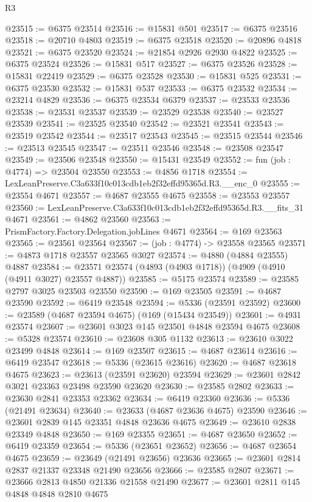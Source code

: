 \begin{lexlean}{R3}
\begin{coremodule}
@23515 := @6375 @23514
@23516 := @15831 @501
@23517 := @6375 @23516
@23518 := @20710 @4803
@23519 := @6375 @23518
@23520 := @20896 @4818
@23521 := @6375 @23520
@23524 := @21854 @2926 @2930 @4822
@23525 := @6375 @23524
@23526 := @15831 @517
@23527 := @6375 @23526
@23528 := @15831 @22419
@23529 := @6375 @23528
@23530 := @15831 @525
@23531 := @6375 @23530
@23532 := @15831 @537
@23533 := @6375 @23532
@23534 := @23214 @4829
@23536 := @6375 @23534 @6379
@23537 := @23533 @23536
@23538 := @23531 @23537
@23539 := @23529 @23538
@23540 := @23527 @23539
@23541 := @23525 @23540
@23542 := @23521 @23541
@23543 := @23519 @23542
@23544 := @23517 @23543
@23545 := @23515 @23544
@23546 := @23513 @23545
@23547 := @23511 @23546
@23548 := @23508 @23547
@23549 := @23506 @23548
@23550 := @15431 @23549
@23552 := fun (job : @4774) => @23504 @23550
@23553 := @4856 @1718
@23554 := LexLeanPreserve.C3a633f10c013cdb1eb2f32effd95365d.R3.__enc_0
@23555 := @23554 @4671
@23557 := @4687 @23555 @4675
@23558 := @23553 @23557
@23560 := LexLeanPreserve.C3a633f10c013cdb1eb2f32effd95365d.R3.__fits_31 @4671
@23561 := @4862 @23560
@23563 := PrismFactory.Factory.Delegation.jobLines @4671
@23564 := @169 @23563
@23565 := @23561 @23564
@23567 := (job : @4774) -> @23558 @23565
@23571 := @4873 @1718 @23557 @23565 @3027
@23574 := @4880 (@4884 @23555) @4887
@23584 := @23571 @23574 (@4893 (@4903 @1718)) (@4909 (@4910 (@4911 @3027) @23557 @4887))
@23585 := @5175 @23574
@23589 := @23585 @2797 @3025 @23503 @23550
@23590 := @169 @23505
@23591 := @4687 @23590
@23592 := @6419 @23548
@23594 := @5336 (@23591 @23592)
@23600 := @23589 (@4687 @23594 @4675) (@169 (@15434 @23549))
@23601 := @4931 @23574
@23607 := @23601 @3023 @145 @23501 @4848 @23594 @4675
@23608 := @5328 @23574
@23610 := @23608 @305 @1132
@23613 := @23610 @3022 @23499 @4848
@23614 := @169 @23507
@23615 := @4687 @23614
@23616 := @6419 @23547
@23618 := @5336 (@23615 @23616)
@23620 := @4687 @23618 @4675
@23623 := @23613 (@23591 @23620) @23594
@23629 := @23601 @2842 @3021 @23363 @23498 @23590 @23620
@23630 := @23585 @2802
@23633 := @23630 @2841 @23353 @23362
@23634 := @6419 @23360
@23636 := @5336 (@21491 @23634)
@23640 := @23633 (@4687 @23636 @4675) @23590
@23646 := @23601 @2839 @145 @23351 @4848 @23636 @4675
@23649 := @23610 @2838 @23349 @4848
@23650 := @169 @23355
@23651 := @4687 @23650
@23652 := @6419 @23359
@23654 := @5336 (@23651 @23652)
@23656 := @4687 @23654 @4675
@23659 := @23649 (@21491 @23656) @23636
@23665 := @23601 @2814 @2837 @21337 @23348 @21490 @23656
@23666 := @23585 @2807
@23671 := @23666 @2813 @4850 @21336 @21558 @21490
@23677 := @23601 @2811 @145 @4848 @4848 @2810 @4675

\end{coremodule}
\end{lexlean}
